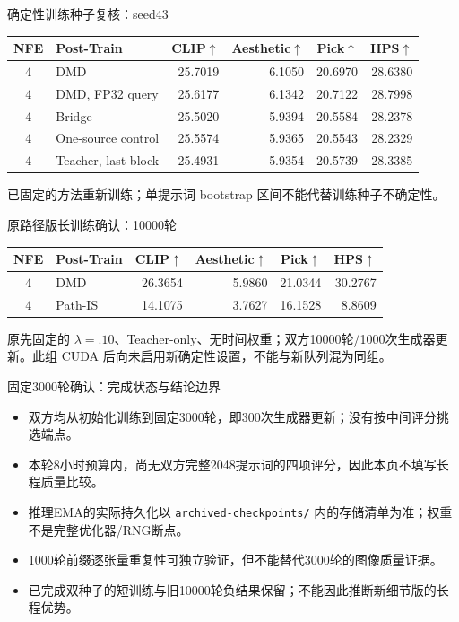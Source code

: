 \documentclass[10pt,aspectratio=169]{beamer}
\begin{document}
\begin{frame}{确定性训练种子复核：seed43}
\scriptsize\centering
\begin{tabular}{clrrrr}\toprule
NFE & Post-Train & CLIP$\uparrow$ & Aesthetic$\uparrow$ & Pick$\uparrow$ & HPS$\uparrow$\\\midrule
4 & DMD & 25.7019 & 6.1050 & 20.6970 & 28.6380 \\
4 & DMD, FP32 query & 25.6177 & 6.1342 & 20.7122 & 28.7998 \\
4 & Bridge & 25.5020 & 5.9394 & 20.5584 & 28.2378 \\
4 & One-source control & 25.5574 & 5.9365 & 20.5543 & 28.2329 \\
4 & Teacher, last block & 25.4931 & 5.9354 & 20.5739 & 28.3385 \\
\bottomrule\end{tabular}\par\raggedright\vspace{6pt}
已固定的方法重新训练；单提示词 bootstrap 区间不能代替训练种子不确定性。
\end{frame}
\begin{frame}{原路径版长训练确认：10000轮}
\scriptsize\centering
\begin{tabular}{clrrrr}\toprule
NFE & Post-Train & CLIP$\uparrow$ & Aesthetic$\uparrow$ & Pick$\uparrow$ & HPS$\uparrow$\\\midrule
4 & DMD & 26.3654 & 5.9860 & 21.0344 & 30.2767 \\
4 & Path-IS & 14.1075 & 3.7627 & 16.1528 & 8.8609 \\
\bottomrule\end{tabular}\par\raggedright\vspace{6pt}
原先固定的 $\lambda=.10$、Teacher-only、无时间权重；双方10000轮/1000次生成器更新。此组 CUDA 后向未启用新确定性设置，不能与新队列混为同组。
\end{frame}
\begin{frame}{固定3000轮确认：完成状态与结论边界}
\small
\begin{itemize}\itemsep6pt
\item 双方均从初始化训练到固定3000轮，即300次生成器更新；没有按中间评分挑选端点。
\item 本轮8小时预算内，尚无双方完整2048提示词的四项评分，因此本页不填写长程质量比较。
\item 推理EMA的实际持久化以 \texttt{archived-checkpoints/} 内的存储清单为准；权重不是完整优化器/RNG断点。
\item 1000轮前缀逐张量重复性可独立验证，但不能替代3000轮的图像质量证据。
\item 已完成双种子的短训练与旧10000轮负结果保留；不能因此推断新细节版的长程优势。
\end{itemize}
\end{frame}
\end{document}
